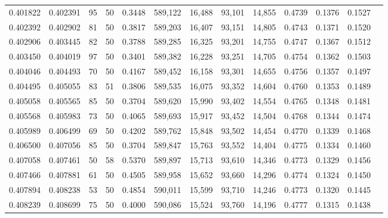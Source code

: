 \begin{tabular}{rrrrrrrrrrrrr}
0.401822 & 0.402391 &    95 &  50 &                                     0.3448 & 589,122 &  16,488 &  93,101 &  14,855 & 0.4739 & 0.1376 & 0.1527 \\
0.402392 & 0.402902 &    81 &  50 &                                     0.3817 & 589,203 &  16,407 &  93,151 &  14,805 & 0.4743 & 0.1371 & 0.1520 \\
0.402906 & 0.403445 &    82 &  50 &                                     0.3788 & 589,285 &  16,325 &  93,201 &  14,755 & 0.4747 & 0.1367 & 0.1512 \\
0.403450 & 0.404019 &    97 &  50 &                                     0.3401 & 589,382 &  16,228 &  93,251 &  14,705 & 0.4754 & 0.1362 & 0.1503 \\
0.404046 & 0.404493 &    70 &  50 &                                     0.4167 & 589,452 &  16,158 &  93,301 &  14,655 & 0.4756 & 0.1357 & 0.1497 \\
0.404495 & 0.405055 &    83 &  51 &                                     0.3806 & 589,535 &  16,075 &  93,352 &  14,604 & 0.4760 & 0.1353 & 0.1489 \\
0.405058 & 0.405565 &    85 &  50 &                                     0.3704 & 589,620 &  15,990 &  93,402 &  14,554 & 0.4765 & 0.1348 & 0.1481 \\
0.405568 & 0.405983 &    73 &  50 &                                     0.4065 & 589,693 &  15,917 &  93,452 &  14,504 & 0.4768 & 0.1344 & 0.1474 \\
0.405989 & 0.406499 &    69 &  50 &                                     0.4202 & 589,762 &  15,848 &  93,502 &  14,454 & 0.4770 & 0.1339 & 0.1468 \\
0.406500 & 0.407056 &    85 &  50 &                                     0.3704 & 589,847 &  15,763 &  93,552 &  14,404 & 0.4775 & 0.1334 & 0.1460 \\
0.407058 & 0.407461 &    50 &  58 &                                     0.5370 & 589,897 &  15,713 &  93,610 &  14,346 & 0.4773 & 0.1329 & 0.1456 \\
0.407466 & 0.407881 &    61 &  50 &                                     0.4505 & 589,958 &  15,652 &  93,660 &  14,296 & 0.4774 & 0.1324 & 0.1450 \\
0.407894 & 0.408238 &    53 &  50 &                                     0.4854 & 590,011 &  15,599 &  93,710 &  14,246 & 0.4773 & 0.1320 & 0.1445 \\
0.408239 & 0.408699 &    75 &  50 &                                     0.4000 & 590,086 &  15,524 &  93,760 &  14,196 & 0.4777 & 0.1315 & 0.1438 \\

\end{tabular}
